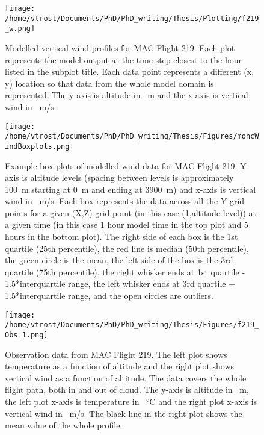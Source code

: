\begin{figure}[H]
	\centering
	\texttt{[image: /home/vtrost/Documents/PhD/PhD\_writing/Thesis/Plotting/f219\_w.png]}
	\caption{Modelled vertical wind profiles for MAC Flight 219. Each plot represents the model output at the time step closest to the hour listed in the subplot title. Each data point represents a different (x, y) location so that data from the whole model domain is represented. The y-axis is altitude in \SI{}{m} and the x-axis is vertical wind in \SI{}{m/s}.}
	\label{fig:moncWind}
\end{figure}

\begin{figure}[H]
	\centering
	\texttt{[image: /home/vtrost/Documents/PhD/PhD\_writing/Thesis/Figures/moncWindBoxplots.png]}
	\caption{Example box-plots of modelled wind data for MAC Flight 219. Y-axis is altitude levels (spacing between levels is approximately \SI{100}{m} starting at \SI{0}{m} and ending at \SI{3900}{m}) and x-axis is vertical wind in \SI{}{m/s}. Each box represents the data across all the Y grid points for a given (X,Z) grid point (in this case (1,altitude level)) at a given time (in this case 1 hour model time in the top plot and 5 hours in the bottom plot). The right side of each box is the 1st quartile (25th percentile), the red line is median (50th percentile), the green circle is the mean, the left side of the box is the 3rd quartile (75th percentile), the right whisker ends at 1st quartile - 1.5*interquartile range, the left whisker ends at 3rd quartile + 1.5*interquartile range, and the open circles are outliers.}
	\label{fig:moncWindBoxplots}
\end{figure}

\begin{figure}[H]
	\centering
	\texttt{[image: /home/vtrost/Documents/PhD/PhD\_writing/Thesis/Figures/f219\_Obs\_1.png]}
	\caption{Observation data from MAC Flight 219. The left plot shows temperature as a function of altitude and the right plot shows vertical wind as a function of altitude. The data covers the whole flight path, both in and out of cloud. The y-axis is altitude in \SI{}{m}, the left plot x-axis is temperature in \SI{}{\degreeCelsius} and the right plot x-axis is vertical wind in \SI{}{m/s}. The black line in the right plot shows the mean value of the whole profile.}
	\label{fig:obs_1}
\end{figure}

